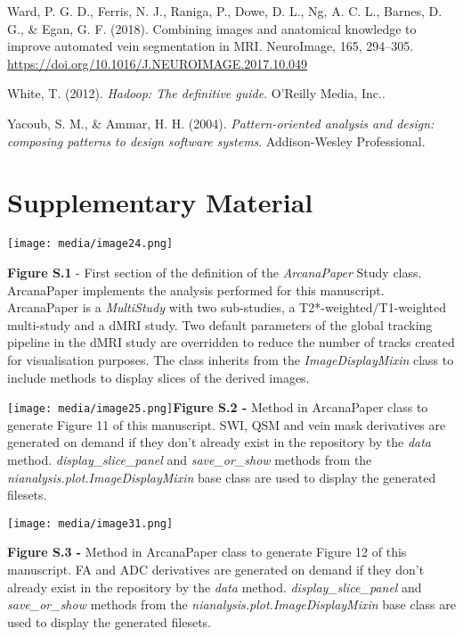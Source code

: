 Ward, P. G. D., Ferris, N. J., Raniga, P., Dowe, D. L., Ng, A. C. L.,
Barnes, D. G., \& Egan, G. F. (2018). Combining images and anatomical
knowledge to improve automated vein segmentation in MRI. NeuroImage,
165, 294--305.
\href{https://doi.org/10.1016/J.NEUROIMAGE.2017.10.049}{{https://doi.org/10.1016/J.NEUROIMAGE.2017.10.049}}

White, T. (2012). \emph{Hadoop: The definitive guide}. O'Reilly Media,
Inc..

Yacoub, S. M., \& Ammar, H. H. (2004). \emph{Pattern-oriented analysis
and design: composing patterns to design software systems}.
Addison-Wesley Professional.

\hypertarget{supplementary-material}{%
\section{Supplementary Material}\label{supplementary-material}}

\texttt{[image: media/image24.png]}

\textbf{Figure S.1} - First section of the definition of the
\emph{ArcanaPaper} Study class. ArcanaPaper implements the analysis
performed for this manuscript. ArcanaPaper is a \emph{MultiStudy} with
two sub-studies, a T2*-weighted/T1-weighted multi-study and a dMRI
study. Two default parameters of the global tracking pipeline in the
dMRI study are overridden to reduce the number of tracks created for
visualisation purposes. The class inherits from the
\emph{ImageDisplayMixin} class to include methods to display slices of
the derived images.

\texttt{[image: media/image25.png]}\textbf{Figure
S.2 -} Method in ArcanaPaper class to generate Figure 11 of this
manuscript. SWI, QSM and vein mask derivatives are generated on demand
if they don't already exist in the repository by the \emph{data} method.
\emph{display\_slice\_panel} and \emph{save\_or\_show} methods from the
\emph{nianalysis.plot.ImageDisplayMixin} base class are used to display
the generated filesets.

\texttt{[image: media/image31.png]}

\textbf{Figure S.3 -} Method in ArcanaPaper class to generate Figure 12
of this manuscript. FA and ADC derivatives are generated on demand if
they don't already exist in the repository by the \emph{data} method.
\emph{display\_slice\_panel} and \emph{save\_or\_show} methods from the
\emph{nianalysis.plot.ImageDisplayMixin} base class are used to display
the generated filesets.


